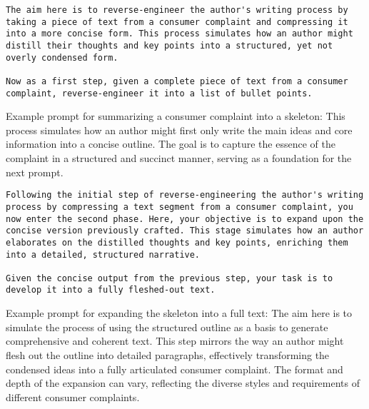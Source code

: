 

\clearpage
\newpage

\begin{suppfigure}[htb!]
\begin{lstlisting}
The aim here is to reverse-engineer the author's writing process by taking a piece of text from a consumer complaint and compressing it into a more concise form. This process simulates how an author might distill their thoughts and key points into a structured, yet not overly condensed form. 

Now as a first step, given a complete piece of text from a consumer complaint, reverse-engineer it into a list of bullet points.
\end{lstlisting}
\caption{
Example prompt for summarizing a consumer complaint into a skeleton: This process simulates how an author might first only write the main ideas and core information into a concise outline. The goal is to capture the essence of the complaint in a structured and succinct manner, serving as a foundation for the next prompt.
}
\label{fig:skeleton-prompt-1}
\end{suppfigure}



\begin{suppfigure}[htb!]
\begin{lstlisting}
Following the initial step of reverse-engineering the author's writing process by compressing a text segment from a consumer complaint, you now enter the second phase. Here, your objective is to expand upon the concise version previously crafted. This stage simulates how an author elaborates on the distilled thoughts and key points, enriching them into a detailed, structured narrative. 

Given the concise output from the previous step, your task is to develop it into a fully fleshed-out text.
\end{lstlisting}
\caption{
Example prompt for expanding the skeleton into a full text: The aim here is to simulate the process of using the structured outline as a basis to generate comprehensive and coherent text. This step mirrors the way an author might flesh out the outline into detailed paragraphs, effectively transforming the condensed ideas into a fully articulated consumer complaint. The format and depth of the expansion can vary, reflecting the diverse styles and requirements of different consumer complaints.
}
\label{fig:skeleton-prompt-2}
\end{suppfigure}



